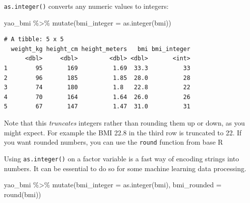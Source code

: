 \documentclass[
  letterpaper,
  DIV=11,
  numbers=noendperiod]{scrreprt}
\newenvironment{Shaded}{\begin{snugshade}}{\end{snugshade}}
\newcommand{\AttributeTok}[1]{\textcolor[rgb]{0.40,0.45,0.13}{#1}}
\newcommand{\FunctionTok}[1]{\textcolor[rgb]{0.28,0.35,0.67}{#1}}
\newcommand{\NormalTok}[1]{\textcolor[rgb]{0.00,0.23,0.31}{#1}}
\newcommand{\SpecialCharTok}[1]{\textcolor[rgb]{0.37,0.37,0.37}{#1}}
\begin{document}
\texttt{as.integer()} converts any numeric values to integers:

\begin{Shaded}
\begin{Highlighting}[]
\NormalTok{yao\_bmi }\SpecialCharTok{\%\textgreater{}\%} 
  \FunctionTok{mutate}\NormalTok{(}\AttributeTok{bmi\_integer =} \FunctionTok{as.integer}\NormalTok{(bmi))}
\end{Highlighting}
\end{Shaded}

\begin{verbatim}
# A tibble: 5 x 5
  weight_kg height_cm height_meters   bmi bmi_integer
      <dbl>     <dbl>         <dbl> <dbl>       <int>
1        95       169          1.69  33.3          33
2        96       185          1.85  28.0          28
3        74       180          1.8   22.8          22
4        70       164          1.64  26.0          26
5        67       147          1.47  31.0          31
\end{verbatim}

Note that this \emph{truncates} integers rather than rounding them up or
down, as you might expect. For example the BMI 22.8 in the third row is
truncated to 22. If you want rounded numbers, you can use the
\texttt{round} function from base R

\begin{tcolorbox}[enhanced jigsaw, titlerule=0mm, colback=white, left=2mm, breakable, opacitybacktitle=0.6, colbacktitle=quarto-callout-note-color!10!white, colframe=quarto-callout-note-color-frame, bottomtitle=1mm, opacityback=0, coltitle=black, arc=.35mm, toptitle=1mm, title=\textcolor{quarto-callout-note-color}{\faInfo}\hspace{0.5em}{Pro Tip}, leftrule=.75mm, toprule=.15mm, bottomrule=.15mm, rightrule=.15mm]

Using \texttt{as.integer()} on a factor variable is a fast way of
encoding strings into numbers. It can be essential to do so for some
machine learning data processing.

\end{tcolorbox}

\begin{Shaded}
\begin{Highlighting}[]
\NormalTok{yao\_bmi }\SpecialCharTok{\%\textgreater{}\%} 
  \FunctionTok{mutate}\NormalTok{(}\AttributeTok{bmi\_integer =} \FunctionTok{as.integer}\NormalTok{(bmi), }
         \AttributeTok{bmi\_rounded =} \FunctionTok{round}\NormalTok{(bmi)) }
\end{Highlighting}
\end{Shaded}
\end{document}
